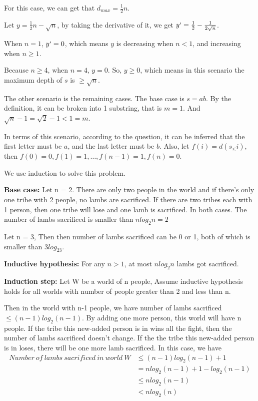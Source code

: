 \documentclass[12pt,a4paper]{article}
\newcommand{\question}[1]{\bigskip\noindent{\textbf{Q{#1} solution}}}
\begin{document}
For this case, we can get that $d_{max}=\frac{1}{2} n$. 

Let $y=\frac{1}{2}n - \sqrt{n}$, by taking the derivative of it, we get $y`= \frac{1}{2}-\frac{1}{2\sqrt{n}}$.

When $n=1$, $y`=0$, which means $y$ is decreasing when $n<1$, and increasing when $n\geq 1$.

Because $n \geq 4$, when $n=4$, $y=0$. So, $y \geq 0$, which means in this scenario the maximum depth of $s$ is $\geq \sqrt{n}$.

The other scenario is the remaining cases. The base case is $s=ab$. By the definition, it can be broken into 1 substring, that is $m=1$. And $\sqrt{n}-1=\sqrt{2} -1 < 1=m$.

In terms of this scenario, according to the question, it can be inferred that the first letter must be $a$, and the last letter must be $b$. Also, let $f(i) = d(s_\leq i)$, then $f(0)=0, f(1)=1, \ldots, f(n-1)=1, f(n)=0$.

\question{1.D}


\question{2}




We use induction to solve this problem. 

\textbf{Base case:} Let n = 2. There are only two people in the world and if there's only one tribe with 2 people, no lambs are sacrificed. If there are two tribes each with 1 person, then one tribe will lose and one lamb is sacrificed. In both cases. The number of lambs sacrificed is smaller than $nlog_2n = 2$

Let n = 3, Then then number of lambs sacrificed can be 0 or 1, both of which is smaller than $3log_23$.

\textbf{Inductive hypothesis:} For any $n > 1$, at most $nlog_2n$ lambs got sacrificed.

\textbf{Induction step:} Let W be a world of n people, Assume inductive hypothesis holds for all worlds with number of people greater than 2 and less than n.

Then in the world with n-1 people, we have number of lambs sacrificed $\le (n-1)log_2(n-1)$. By adding one more person, this world will have n people. If the tribe this new-added person is in wins all the fight, then the number of lambs sacrificed doesn't change. If the the tribe this new-added person is in loses, there will be one more lamb sacrificed. In this case, we have
\begin{equation*}
    \begin{split}
        Number\ of\ lambs\ sacrificed\ in\ world\ W & \le (n-1)log_2(n-1) + 1 \\
             & = nlog_2(n-1) + 1 - log_2(n-1) \\
             & \le nlog_2(n-1) \\
             & < nlog_2(n) \\
    \end{split}
\end{equation*}
\end{document}
